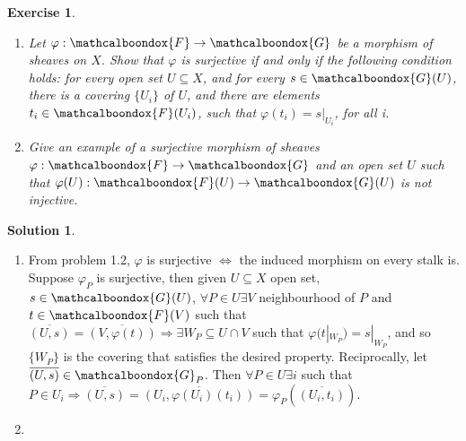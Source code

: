 \documentclass[12pt]{article}
\newcommand{\imp}{\ensuremath{\Rightarrow}}
\newtheorem{ex}{Exercise}[section]
\theoremstyle{definition}
\newtheorem*{sol}{Solution}
\newcommand{\sF}{\ensuremath{\mathcalboondox{F}}}
\newcommand{\sG}{\ensuremath{\mathcalboondox{G}}}
\begin{document}
\begin{ex}
	\begin{enumerate}[label=\alph*)]
		\item Let $\varphi: \sF \to \sG$ be a morphism of sheaves on $X$. Show that $\varphi$ is surjective if and only if the following condition holds: for every open set $U \subseteq X$, and for every $s \in \sG(U)$, there is a covering $\{U_i\}$ of $U$, and there are elements $t_i \in \sF(U_i)$, such that $\varphi(t_i) = s|_{U_i}$, for all i.

		\item Give an example of a surjective morphism of sheaves $\varphi: \sF \to \sG$ and an open set $U$ such that $\varphi(U): \sF(U) \to \sG(U)$ is not injective.
	\end{enumerate}
\end{ex}

\begin{sol}
	\begin{enumerate}[label=\alph*)]
		\item From problem 1.2, $\varphi$ is surjective $\iff$ the induced morphism on every stalk is. Suppose $\varphi_P$ is surjective, then given $U \subseteq X$ open set, $s \in \sG(U)$, $\forall P \in U \exists V$ neighbourhood of $P$ and $t \in \sF(V)$ such that $\overline{(U,s)} = \overline{(V,\varphi(t))} \imp \exists W_P \subseteq U \cap V$ such that $\varphi(t|_{W_P}) = s|_{W_P}$, and so $\{W_P\}$ is the covering that satisfies the desired property. Reciprocally, let $\overline{(U,s)} \in \sG_P$. Then $\forall P \in U \exists i$ such that $P \in U_i \imp \overline{(U,s)} = \overline{(U_i, \varphi(U_i)(t_i))} = \varphi_P(\overline{(U_i, t_i)})$.

		\item
	\end{enumerate}
\end{sol}
\end{document}
